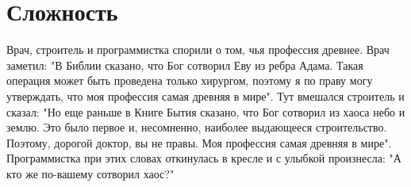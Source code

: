 \documentclass[11pt]{article}
\begin{document}
\begin{center}
		\bf\section*{Сложность}
\end{center}

\begin{small}
	\begin{oddsidemargin}
Врач, строитель и программистка спорили о том, чья профессия древнее. Врач заметил: "В Библии сказано, что Бог сотворил Еву из ребра Адама. Такая операция может быть проведена только хирургом, поэтому я по праву могу утверждать, что моя профессия самая древняя в мире". Тут вмешался строитель и сказал: "Но еще раньше в Книге Бытия сказано, что Бог сотворил из хаоса небо и землю. Это было первое и, несомненно, наиболее выдающееся строительство. Поэтому, дорогой доктор, вы не правы. Моя профессия самая древняя в мире". Программистка при этих словах откинулась в кресле и с улыбкой произнесла: "А кто же по-вашему сотворил хаос?"
	\end{oddsidemargin}
\end{small}
\end{document}
